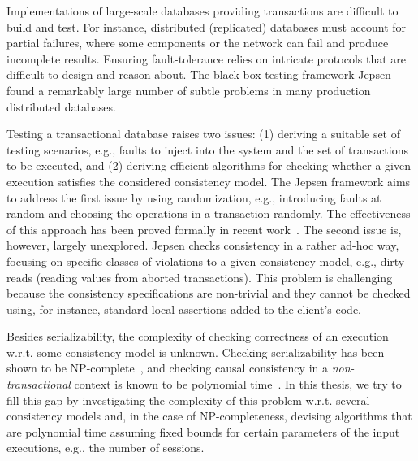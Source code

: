 Implementations of large-scale databases providing transactions are difficult to build and test. For instance, distributed (replicated) databases must account for partial failures, where some components or the network can fail and produce incomplete results. Ensuring fault-tolerance relies on intricate protocols that are difficult to design and reason about. The black-box testing framework Jepsen~\cite{jepsen} found a remarkably large number of subtle problems in many production distributed databases. %

Testing a transactional database raises two issues: (1) deriving a suitable set of testing scenarios, e.g., faults to inject into the system and the set of transactions to be executed, and (2) deriving efficient algorithms for checking whether a given execution satisfies the considered consistency model. The Jepsen framework aims to address the first issue by using randomization, 
e.g., introducing faults at random and choosing the operations in a transaction randomly. The effectiveness of this approach has been proved formally in recent work~\cite{DBLP:journals/pacmpl/OzkanMNBW18}. The second issue is, however, largely unexplored. Jepsen checks consistency in a rather ad-hoc way, focusing on specific classes of violations to a given consistency model, e.g., dirty reads (reading values from aborted transactions). This problem is challenging because the consistency specifications are non-trivial and they cannot be checked using, for instance, standard local assertions added to the client's code. 

Besides serializability, the complexity of checking correctness of an execution w.r.t. some consistency model is unknown. Checking serializability has been shown to be NP-complete~\cite{DBLP:journals/jacm/Papadimitriou79b}, and checking causal consistency in a \emph{non-transactional} context is known to be polynomial time~\cite{DBLP:conf/popl/BouajjaniEGH17}. In this thesis, we try to fill this gap by investigating the complexity of this problem w.r.t. several consistency models and, in the case of NP-completeness, devising algorithms that are polynomial time assuming fixed bounds for certain parameters of the input executions, e.g., the number of sessions. 

